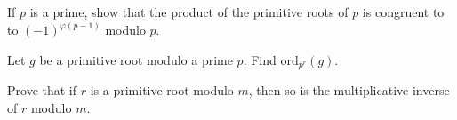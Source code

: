 \documentclass{subfile}
\begin{document}
	\begin{problem}
		If $p$ is a prime, show that the product of the primitive roots of $p$ is congruent to to $(-1)^{\varphi(p-1)}$ modulo $p$. %
	\end{problem}


	\begin{problem}
		Let $g$ be a primitive root modulo a prime $p$. Find $\text{ord}_{p^r}(g)$. %
	\end{problem}


	\begin{problem}
		Prove that if $r$ is a primitive root modulo $m$, then so is the multiplicative inverse of $r$ modulo $m$. %
	\end{problem}
\end{document}
